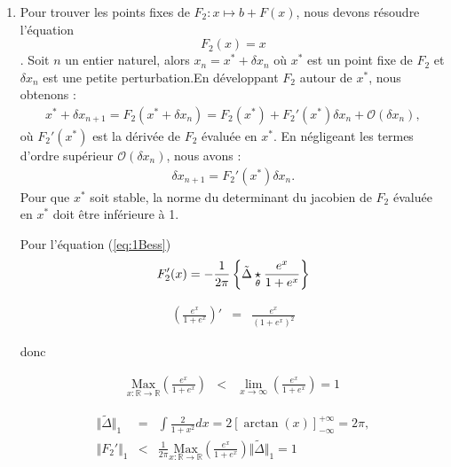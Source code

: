 \begin{enumerate}[label = Méthode \arabic*)]
		
	\item Pour trouver les points fixes de \(F_2: x \mapsto b + F(x)\), nous devons résoudre l'équation $$F_2(x) = x$$. Soit \(n\) un entier naturel, alors \(x_n = x^\ast + \delta x_n\) où \(x^\ast\) est un point fixe de \(F_2\) et \(\delta x_n\) est une petite perturbation.En développant \(F_2\) autour de \(x^\ast\), nous obtenons :
	\begin{eqnarray}
	x^\ast + \delta x_{n+1} = F_2(x^\ast + \delta x_n) = F_2(x^\ast) + F_2'(x^\ast)\delta x_n + \mathcal{O}(\delta x_n),
	\end{eqnarray}
	où \(F_2'(x^\ast)\) est la dérivée de \(F_2\) évaluée en \(x^\ast\). En négligeant les termes d'ordre supérieur \(\mathcal{O}(\delta x_n)\), nous avons :
	\begin{eqnarray}
		\delta x_{n+1} = F_2'(x^\ast)\delta x_n.
	\end{eqnarray}
	Pour que \(x^\ast\) soit stable, la norme du determinant du jacobien de \(F_2\) évaluée en \(x^\ast\) doit être inférieure à 1.
	
	Pour l'équation (\ref{eq:1Bess}) 
	\begin{eqnarray} 
		F_2' ( x ) =   - \frac{1}{2 \pi}\left \{ \tilde{\Delta} \underset{\tiny \tilde{\theta}}{\star} \frac{ e^x }{ 1 + e^{x} } \right \} 
	\end{eqnarray}
	
	\begin{eqnarray}
		\left ( \frac{ e^x }{ 1 + e^{x} } \right )' 	& = & \frac{ e^x }{ (1 + e^{x})^2 }     
	\end{eqnarray}
	
	donc 
	
	\begin{eqnarray}
		\underset{x \colon \mathbb{R} \to \mathbb{R} }{\mbox{Max}}\left ( \frac{ e^x }{ 1 + e^{x} } \right ) 	& < & \underset{ x \to \infty}{ \lim}  \left ( \frac{ e^x }{ 1 + e^{x} } \right ) = 1    
	\end{eqnarray}


	\begin{eqnarray}
		\Vert \tilde{\Delta} \Vert_1  & = & \int \frac{2}{1 + x^2 } dx = 2 \left [ \arctan (x) \right ]_{-\infty}^{+ \infty} = 2 \pi , \\
		\Vert F_2' \Vert_1 & < &  \frac{1}{2\pi} \underset{x \colon \mathbb{R} \to \mathbb{R} }{\mbox{Max}}\left ( \frac{ e^x }{ 1 + e^{x} } \right )  \Vert \tilde{\Delta} \Vert_1  = 1 
	\end{eqnarray}
	

\end{enumerate}
